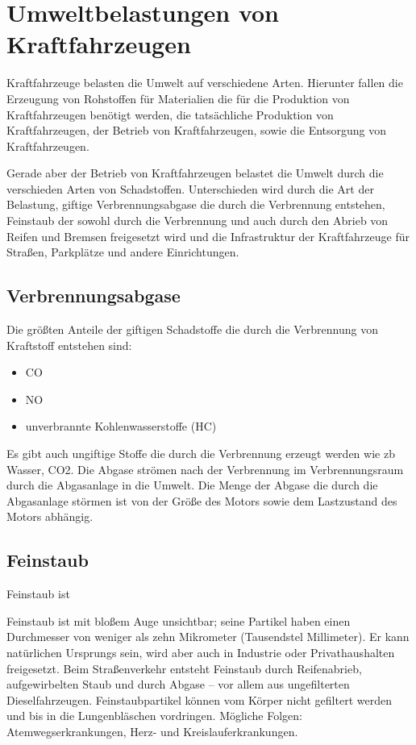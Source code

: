 \section{Umweltbelastungen von Kraftfahrzeugen}
Kraftfahrzeuge belasten die Umwelt auf verschiedene Arten. Hierunter fallen 
die Erzeugung von Rohstoffen für Materialien die für die Produktion von Kraftfahrzeugen benötigt werden, 
die tatsächliche Produktion von Kraftfahrzeugen,
der Betrieb von Kraftfahrzeugen,
sowie die Entsorgung von Kraftfahrzeugen.

Gerade aber der Betrieb von Kraftfahrzeugen belastet die Umwelt durch die verschieden Arten von Schadstoffen.
Unterschieden wird durch die Art der Belastung, 
giftige Verbrennungsabgase die durch die Verbrennung entstehen, 
Feinstaub der sowohl durch die Verbrennung und auch durch den Abrieb von Reifen und Bremsen freigesetzt wird
und die Infrastruktur der Kraftfahrzeuge für Straßen, Parkplätze und andere Einrichtungen.

\subsection{Verbrennungsabgase}
Die größten Anteile der giftigen Schadstoffe die durch die Verbrennung von Kraftstoff entstehen sind:
\begin{itemize}
	\item {\ac{CO}}
	\item {\ac{NO}}
	\item unverbrannte Kohlenwasserstoffe (HC)
\end{itemize}
Es gibt auch ungiftige Stoffe die durch die Verbrennung erzeugt werden wie \ac{zb} Wasser, \ac{CO2}.
Die Abgase strömen nach der Verbrennung im Verbrennungsraum durch die Abgasanlage in die Umwelt.
Die Menge der Abgase die durch die Abgasanlage störmen ist von der Größe des Motors sowie dem Lastzustand des Motors abhängig.

\subsection{Feinstaub}
Feinstaub ist 

Feinstaub ist mit bloßem Auge unsichtbar; seine Partikel haben einen Durchmesser von weniger als zehn Mikrometer (Tausendstel Millimeter). 
Er kann natürlichen Ursprungs sein, wird aber auch in Industrie oder Privathaushalten freigesetzt. 
Beim Straßenverkehr entsteht Feinstaub durch Reifenabrieb, aufgewirbelten Staub und durch Abgase – vor allem aus ungefilterten Dieselfahrzeugen. 
Feinstaubpartikel können vom Körper nicht gefiltert werden und bis in die Lungenbläschen vordringen. 
Mögliche Folgen: Atemwegserkrankungen, Herz- und Kreislauferkrankungen.

